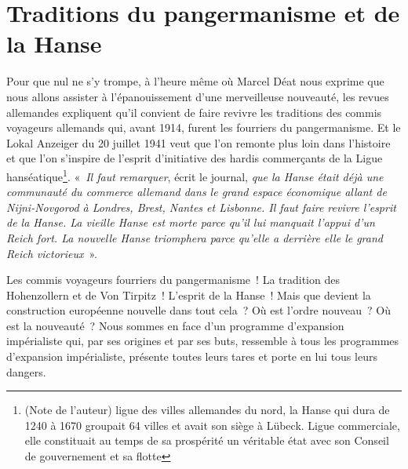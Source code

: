 \documentclass[french,twoside]{book} %
\begin{document}
\section[{Traditions du pangermanisme et de la Hanse}]{Traditions du pangermanisme et de la Hanse}
\noindent Pour que nul ne s’y trompe, à l’heure même où Marcel Déat nous exprime que nous allons assister à l’épanouissement d’une merveilleuse nouveauté, les revues allemandes expliquent qu’il convient de faire revivre les traditions des commis voyageurs allemands qui, avant 1914, furent les fourriers du pangermanisme. Et le Lokal Anzeiger du 20 juillet 1941 veut que l’on remonte plus loin dans l’histoire et que l’on s’inspire de l’esprit d’initiative des hardis commerçants de la Ligue hanséatique\footnote{(Note de l’auteur) ligue des villes allemandes du nord, la Hanse qui dura de 1240 à 1670 groupait 64 villes et avait son siège à Lübeck. Ligue commerciale, elle constituait au temps de sa prospérité un véritable état avec son Conseil de gouvernement et sa flotte}. « \emph{Il faut remarquer}, écrit le journal, \emph{que la Hanse était déjà une communauté du commerce allemand dans le grand espace économique allant de Nijni-Novgorod à Londres, Brest, Nantes et Lisbonne. Il faut faire revivre l’esprit de la Hanse. La vieille Hanse est morte parce qu’il lui manquait l’appui d’un Reich fort. La nouvelle Hanse triomphera parce qu’elle a derrière elle le grand Reich victorieux} ».\par
Les commis voyageurs fourriers du pangermanisme ! La tradition des Hohenzollern et de Von Tirpitz ! L’esprit de la Hanse ! Mais que devient la construction européenne nouvelle dans tout cela ? Où est l’ordre nouveau ? Où est la nouveauté ? Nous sommes en face d’un programme d’expansion impérialiste qui, par ses origines et par ses buts, ressemble à tous les programmes d’expansion impérialiste, présente toutes leurs tares et porte en lui tous leurs dangers.
\end{document}
